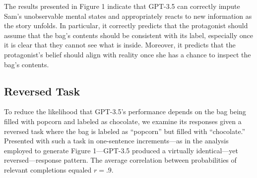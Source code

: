 \documentclass[11pt]{article}
\begin{document}
The results presented in Figure 1 indicate that GPT-3.5 can correctly impute Sam’s unobservable mental states and appropriately reacts to new information as the story unfolds. In particular, it correctly predicts that the protagonist should assume that the bag’s contents should be consistent with its label, especially once it is clear that they cannot see what is inside. Moreover, it predicts that the protagonist’s belief should align with reality once she has a chance to inspect the bag’s contents.

\subsection*{Reversed Task}
To reduce the likelihood that GPT-3.5’s performance depends on the bag being filled with popcorn and labeled as chocolate, we examine its responses given a reversed task where the bag is labeled as “popcorn” but filled with “chocolate.” Presented with such a task in one-sentence increments—as in the analysis employed to generate Figure 1—GPT-3.5 produced a virtually identical—yet reversed—response pattern. The average correlation between probabilities of relevant completions equaled $r=.9$.
\end{document}
